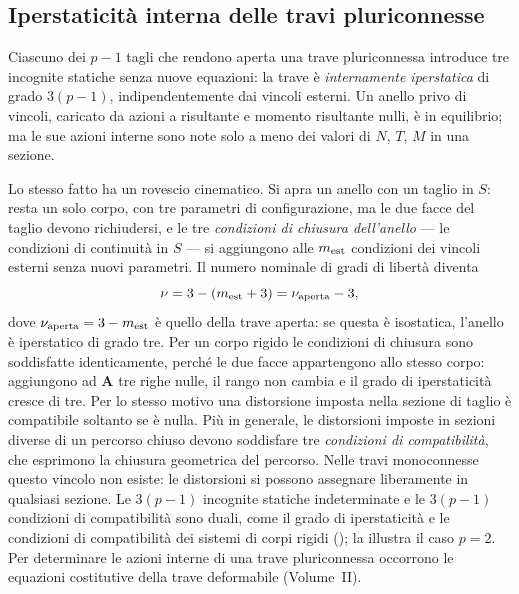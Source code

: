 \subsection{Iperstaticità interna delle travi pluriconnesse}
\label{sec:ipestat_interna}

Ciascuno dei $p-1$ tagli che rendono aperta una trave
pluriconnessa introduce tre incognite statiche senza
nuove equazioni: la trave è \emph{internamente
	iperstatica}
di grado $3(p-1)$, indipendentemente dai vincoli esterni.
Un anello privo di vincoli, caricato da azioni a
risultante e momento risultante nulli, è in equilibrio;
ma le sue azioni interne sono note solo a meno dei
valori di $N$, $T$, $M$ in una sezione.

Lo stesso fatto ha un rovescio cinematico. Si apra un
anello con un taglio in $S$: resta un solo corpo, con tre
parametri di configurazione, ma le due facce del taglio
devono richiudersi, e le tre \emph{condizioni di chiusura
	dell'anello}
--- le condizioni di continuità in $S$ --- si aggiungono
alle $m_{\rm est}$ condizioni dei vincoli esterni senza
nuovi parametri. Il numero nominale di gradi di libertà
diventa
\begin{equation*}
	\nu = 3 - (m_{\rm est} + 3) = \nu_{\rm aperta} - 3,
\end{equation*}
dove $\nu_{\rm aperta} = 3 - m_{\rm est}$ è quello della
trave aperta: se questa è isostatica, l'anello è
iperstatico di grado tre. Per un corpo rigido le
condizioni di chiusura sono soddisfatte identicamente,
perché le due facce appartengono allo stesso corpo:
aggiungono ad $\bm{A}$ tre righe nulle, il rango non
cambia e il grado di iperstaticità cresce di tre. Per lo
stesso motivo una distorsione imposta nella sezione di
taglio è compatibile soltanto se è nulla. Più in
generale, le distorsioni imposte in sezioni diverse di
un percorso chiuso devono soddisfare tre \emph{condizioni
	di compatibilità},
che esprimono la chiusura geometrica del percorso. Nelle
travi monoconnesse questo vincolo non esiste: le
distorsioni si possono assegnare liberamente in qualsiasi
sezione. Le
$3(p-1)$ incognite statiche indeterminate e le $3(p-1)$
condizioni di compatibilità sono duali, come il grado di
iperstaticità e le condizioni di compatibilità dei sistemi
di corpi rigidi (); la
 illustra il caso $p = 2$.
Per determinare le azioni interne di una trave
pluriconnessa occorrono le equazioni costitutive della
trave deformabile (Volume~II).

